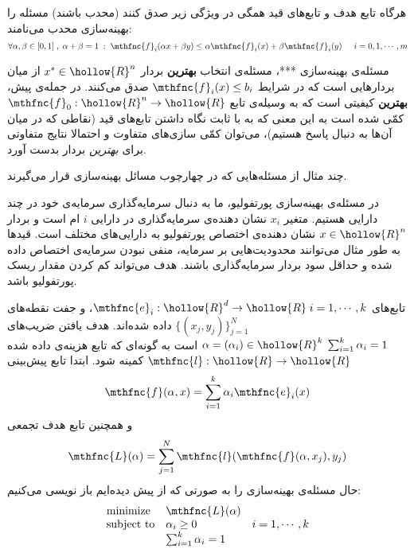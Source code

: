 هرگاه تابع هدف و تابع‌های قید همگی در ویژگی زیر صدق کنند (محدب
باشند) مسئله را بهینه‌سازی محدب
می‌نامند:
\[
\forall \alpha,\beta \in [0,1] \; , \; \alpha + \beta = 1 \; : \; \mthfnc{f}_i( \alpha x + \beta y ) \leq \alpha \mthfnc{f}_i(x) + \beta \mthfnc{f}_i(y) \hspace{5mm} i = 0,1,\cdots,m
\]



مسئله‌ی بهینه‌سازی ***، مسئله‌ی انتخاب 
\textbf{
بهترین
} 
بردار 
$x^* \in \hollow{R}^n$ 
از میان بردارهایی است که در شرایط 
$\mthfnc{f}_i(x) \leq b_i$ 
صدق می‌کنند. در جمله‌ی پیش، 
\textbf{
بهترین
} 
کیفیتی است که به وسیله‌ی تابع 
$\mthfnc{f}_0: \hollow{R}^n \rightarrow \hollow{R}$ 
کمّی شده است به این معنی که به با ثابت نگاه داشتن تابع‌های قید (نقاطی که در میان آن‌ها به دنبال پاسخ هستیم)، می‌توان کمّی سازی‌های متفاوت و احتمالا نتایج متفاوتی برای 
\emph{
بهترین
} 
بردار بدست آورد.

چند مثال از مسئله‌هایی که در چهارچوب مسائل بهینه‌سازی قرار می‌گیرند.

در مسئله‌ی بهینه‌سازی پورتفولیو، ما به دنبال سرمایه‌گذاری سرمایه‌ی
خود در چند دارایی
هستیم. متغیر 
$x_i$ 
نشان دهنده‌ی سرمایه‌گذاری در دارایی 
$i$
ام است و بردار 
$x \in \hollow{R}^n$ 
نشان دهنده‌ی اختصاص پورتفولیو به دارایی‌های مختلف است. قیدها به طور مثال می‌توانند محدودیت‌هایی بر سرمایه، منفی نبودن سرمایه‌ی اختصاص داده شده و حداقل سود بردار سرمایه‌گذاری باشند. هدف می‌تواند کم کردن مقدار ریسک
پورتفولیو باشد.


تابع‌های 
$\mthfnc{e}_i : \hollow{R}^d \rightarrow \hollow{R} \; i=1,\cdots,k$، 
و جفت نقطه‌های 
$\{ (x_j, y_j) \}^{N}_{j=1}$ 
داده شده‌اند. هدف یافتن ضریب‌های 
$\alpha = (\alpha_i) \in \hollow{R}^k \; \sum^{k}_{i=1} \alpha_i = 1$ 
است به گونه‌ای که تابع هزینه‌ی داده شده 
$\mthfnc{l} : \hollow{R} \rightarrow \hollow{R}$ 
کمینه شود. ابتدا تابع پیش‌بینی
\[
\mthfnc{f}(\alpha, x) = \sum^{k}_{i=1} \alpha_i \mthfnc{e}_i(x)
\]
و همچنین تابع هدف تجمعی 
\[
\mthfnc{L}(\alpha) = \sum^{N}_{j=1} \mthfnc{l} ( \mthfnc{f}(\alpha, x_j) , y_j )
\]
حال مسئله‌ی بهینه‌سازی را به صورتی که از پیش دیده‌ایم باز نویسی می‌کنیم:
\[
\begin{array}{lll}
\mbox{minimize} & \mthfnc{L}(\alpha) & \\
\mbox{subject to} & \alpha_i \geq 0 & i = 1,\cdots, k\\
& \sum^{k}_{i=1} \alpha_i = 1 & 
\end{array}
\]


